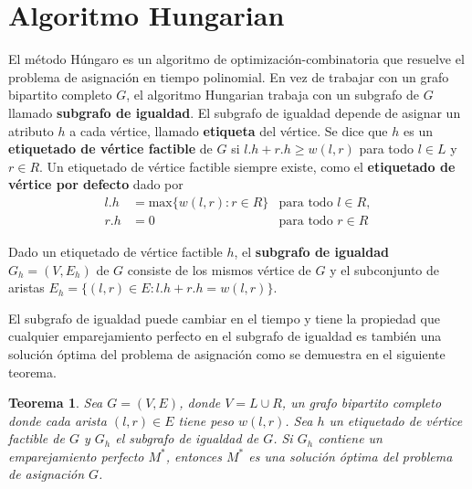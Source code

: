 \documentclass[10pt]{article} %
\newtheorem{thm}{Teorema}
\begin{document}
	\section{Algoritmo Hungarian}

El método Húngaro es un algoritmo de optimización-combinatoria que resuelve el problema de asignación en tiempo polinomial. En vez de trabajar con un grafo bipartito completo $G$, el algoritmo Hungarian trabaja con un subgrafo de $G$ llamado \textbf{subgrafo de igualdad}. El subgrafo de igualdad depende de asignar un atributo $h$ a cada v\'ertice, llamado \textbf{etiqueta} del v\'ertice. Se dice que $h$ es un \textbf{etiquetado de vértice factible} de $G$ si $l.h + r.h \geq w(l,r)$ para todo $l \in L$ y $r \in R$. Un etiquetado de v\'ertice factible siempre existe, como el \textbf{etiquetado de v\'ertice por defecto} dado por
\begin{align}
	\label{eq:defecto}
	l.h &= \text{max} \{w(l,r):r \in R\} &\text{para todo } l \in R,\\
	r.h &= 0 &\text{para todo } r \in R 
\end{align}

Dado un etiquetado de v\'ertice factible $h$, el \textbf{subgrafo de igualdad} $G_h = (V, E_h)$ de $G$ consiste de los mismos v\'ertice de $G$ y el subconjunto de aristas $E_h = \{(l,r) \in E: l.h + r.h = w(l,r)\}$.

El subgrafo de igualdad puede cambiar en el tiempo y tiene la propiedad que cualquier emparejamiento perfecto en el subgrafo de igualdad es tambi\'en una soluci\'on \'optima del problema de asignaci\'on como se demuestra en el siguiente teorema.
\begin{thm} \cite{introduction}
	\label{thm: emparejamiento}
	Sea $G=(V,E)$, donde $V = L \cup R$, un grafo bipartito completo donde cada arista $(l,r) \in E$ tiene peso $w(l,r)$. Sea $h$ un etiquetado de v\'ertice factible de $G$ y $G_h$ el subgrafo de igualdad de $G$. Si $G_h$ contiene un emparejamiento perfecto $M^*$, entonces $M^*$ es una soluci\'on \'optima del problema de asignaci\'on $G$. 
	
\end{thm}
\end{document}
